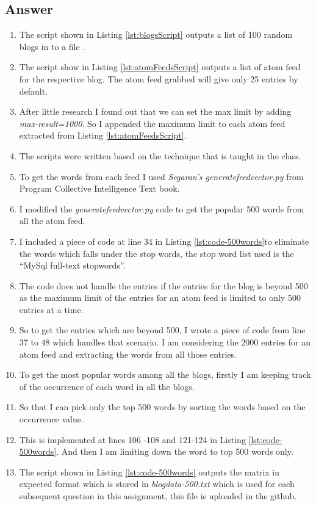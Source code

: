 \subsection{Answer}
\begin{enumerate}
\item The script shown in Listing \ref{lst:blogsScript} outputs a list of 100 random blogs in to a file . 
\item The script show in Listing \ref{lst:atomFeedsScript} outputs a list of atom feed for the respective blog. The atom feed grabbed will give only 25 entries by default.
\item After little research I found out that we can set the max limit by adding \emph{max-result=1000}. So I appended the maximum limit to each atom feed extracted from Listing \ref{lst:atomFeedsScript}. 
\item The scripts were written based on the technique that is taught in the class.
\item To get the words from each feed I used \emph{Segaran's generatefeedvector.py} from Program Collective Intelligence Text book. 
\item I modified the \emph{generatefeedvector.py} code to get the popular 500 words from all the atom feed.
\item I included a piece of code at line 34 in Listing \ref{lst:code-500words}to eliminate the words which falls under the stop words, the stop word list used is the ``MySql full-text stopwords''. 
\item The code does not handle the entries if the entries for the blog is beyond 500 as the maximum limit of the entries for an atom feed is limited to only 500 entries at a time. 
\item So to get the entries which are beyond 500, I wrote a piece of code from line 37 to 48 which handles that scenario. I am considering the 2000 entries for an atom feed and extracting the words from all those entries.  
\item To get the most popular words among all the blogs, firstly I am keeping track of the occurrence of each word in all the blogs.
\item So that I can pick only the top 500 words by sorting the words based on the occurrence value. 
\item This is implemented at lines 106 -108 and  121-124 in Listing \ref{lst:code-500words}. And then I am limiting down the word to top 500 words only.
\item The script shown in Listing \ref{lst:code-500words} outputs the matrix in expected format which is stored in \emph{blogdata-500.txt} which is used for each subsequent question in this assignment, this file is uploaded in the github. 

\end{enumerate}
